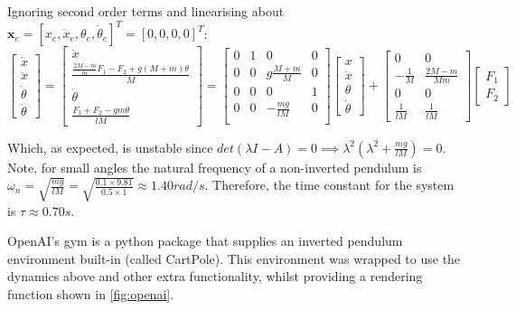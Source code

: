 \documentclass[../main.tex]{subfiles}
\begin{document}
Ignoring second order terms and linearising about $\boldsymbol{x}_e = [x_e, \dot{x}_e, \theta_e, \dot{\theta}_e]^T = [0, 0, 0, 0]^T$:
\begin{equation}
\begin{bmatrix} \dot{x} \\ \ddot{x} \\ \dot{\theta} \\ \ddot{\theta} \end{bmatrix} 
=   \begin{bmatrix} 
    \dot{x} \\ 
    \frac{\frac{2M-m}{m}F_1-F_2 + g(M+m)\theta}{M} \\ 
    \dot{\theta} \\ 
    \frac{F_1 + F_2 - gm\theta}{lM} 
    \end{bmatrix}
=   \begin{bmatrix} 
    0 & 1 & 0 & 0 \\
    0 & 0 & g\frac{M+m}{M} & 0 \\
    0 & 0 & 0 & 1 \\
    0 & 0 & -\frac{mg}{lM} & 0 \\
    \end{bmatrix}
    \begin{bmatrix} x \\ \dot{x} \\ \theta \\ \dot{\theta} \end{bmatrix}
+  \begin{bmatrix} 0 & 0 \\ -\frac{1}{M} & \frac{2M-m}{Mm} \\ 0 & 0 \\ \frac{1}{lM} & \frac{1}{lM} \end{bmatrix} 
\begin{bmatrix} F_1 \\ F_2 \end{bmatrix}
\end{equation}

Which, as expected, is unstable since $det(\lambda I - A) = 0 \implies \lambda^2(\lambda^2 + \frac{mg}{lM}) = 0$. Note, for small angles the natural frequency of a non-inverted pendulum is $\omega_n = \sqrt{\frac{mg}{lM}} = \sqrt{\frac{0.1\times 9.81}{0.5\times 1}} \approx 1.40 rad/s$. Therefore, the time constant for the system is $\tau \approx 0.70s$. 

OpenAI's gym is a python package that supplies an inverted pendulum environment built-in (called CartPole). This environment was wrapped to use the dynamics above and other extra functionality, whilst providing a rendering function shown in \cref{fig:openai}.
\end{document}
